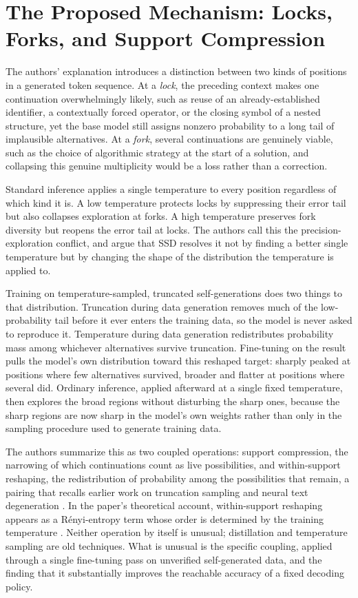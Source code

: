 \documentclass[11pt]{article}
\begin{document}
\section{The Proposed Mechanism: Locks, Forks, and Support Compression}

The authors' explanation introduces a distinction between two kinds of positions in a generated token sequence. At a \emph{lock}, the preceding context makes one continuation overwhelmingly likely, such as reuse of an already-established identifier, a contextually forced operator, or the closing symbol of a nested structure, yet the base model still assigns nonzero probability to a long tail of implausible alternatives. At a \emph{fork}, several continuations are genuinely viable, such as the choice of algorithmic strategy at the start of a solution, and collapsing this genuine multiplicity would be a loss rather than a correction.

Standard inference applies a single temperature to every position regardless of which kind it is. A low temperature protects locks by suppressing their error tail but also collapses exploration at forks. A high temperature preserves fork diversity but reopens the error tail at locks. The authors call this the precision-exploration conflict, and argue that SSD resolves it not by finding a better single temperature but by changing the shape of the distribution the temperature is applied to.

Training on temperature-sampled, truncated self-generations does two things to that distribution. Truncation during data generation removes much of the low-probability tail before it ever enters the training data, so the model is never asked to reproduce it. Temperature during data generation redistributes probability mass among whichever alternatives survive truncation. Fine-tuning on the result pulls the model's own distribution toward this reshaped target: sharply peaked at positions where few alternatives survived, broader and flatter at positions where several did. Ordinary inference, applied afterward at a single fixed temperature, then explores the broad regions without disturbing the sharp ones, because the sharp regions are now sharp in the model's own weights rather than only in the sampling procedure used to generate training data.

The authors summarize this as two coupled operations: support compression, the narrowing of which continuations count as live possibilities, and within-support reshaping, the redistribution of probability among the possibilities that remain, a pairing that recalls earlier work on truncation sampling and neural text degeneration \cite{holtzman2020degeneration,hewitt2022truncation}. In the paper's theoretical account, within-support reshaping appears as a R\'enyi-entropy term whose order is determined by the training temperature \cite{renyi1961entropy,zhang2026ssd}. Neither operation by itself is unusual; distillation and temperature sampling are old techniques. What is unusual is the specific coupling, applied through a single fine-tuning pass on unverified self-generated data, and the finding that it substantially improves the reachable accuracy of a fixed decoding policy.
\end{document}
